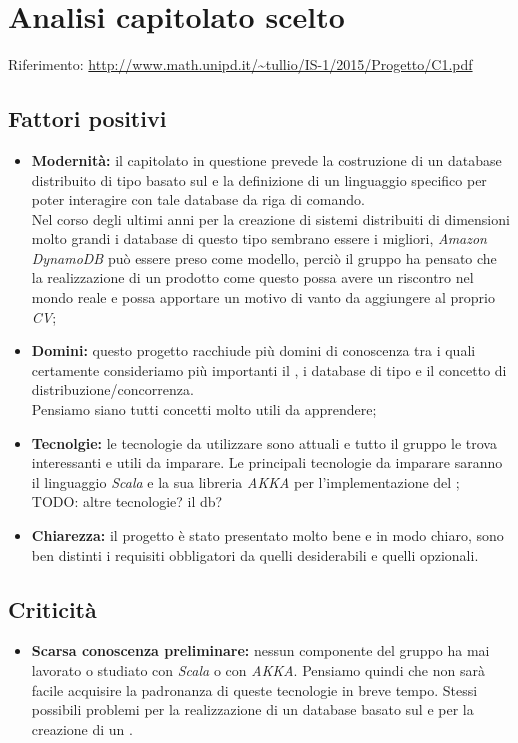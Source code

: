 \documentclass{scalatekids-article}
\begin{document}
\section{Analisi capitolato scelto}
Riferimento: \url{http://www.math.unipd.it/~tullio/IS-1/2015/Progetto/C1.pdf}\\
\subsection{Fattori positivi}
\begin{itemize}
  \item \textbf{Modernità:} il capitolato in questione prevede la costruzione di un database  distribuito di tipo  basato sul  e la definizione di un linguaggio specifico per poter interagire con tale database da riga di comando.\\
  Nel corso degli ultimi anni per la creazione di sistemi distribuiti di dimensioni molto grandi i database di questo tipo sembrano essere i migliori, \textit{Amazon DynamoDB} può essere preso come modello, perciò il gruppo ha pensato che la realizzazione di un prodotto come questo possa avere un riscontro nel mondo reale e possa apportare un motivo di vanto da aggiungere al proprio \textit{CV};
  \item \textbf{Domini:} questo progetto racchiude più domini di conoscenza tra i quali certamente consideriamo più importanti il , i database  di tipo  e il concetto di distribuzione/concorrenza. \\
  Pensiamo siano tutti concetti molto utili da apprendere;
  \item \textbf{Tecnolgie:} le tecnologie da utilizzare sono attuali e tutto il gruppo le trova interessanti e utili da imparare. Le principali tecnologie da imparare saranno il linguaggio \textit{Scala} e la sua libreria \textit{AKKA} per l'implementazione del ;
  \\TODO: altre tecnologie? il db?\\
  \item \textbf{Chiarezza:} il progetto è stato presentato molto bene e in modo chiaro, sono ben distinti i requisiti obbligatori da quelli desiderabili e quelli opzionali.
\end{itemize}
\subsection{Criticità}
\begin{itemize}
  \item \textbf{Scarsa conoscenza preliminare:} nessun componente del gruppo ha mai lavorato o studiato con \textit{Scala} o con \textit{AKKA}. Pensiamo quindi che non sarà facile acquisire la padronanza di queste tecnologie in breve tempo.
  Stessi possibili problemi per la realizzazione di un database basato sul  e per la creazione di un .  
\end{itemize}
\end{document}
